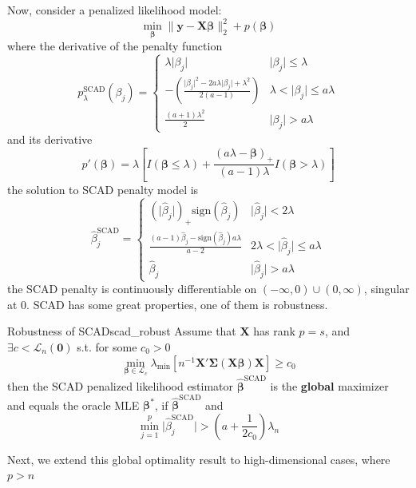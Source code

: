 \documentclass[twoside]{article}
\begin{document}
Now, consider a penalized likelihood model:  \citep[smoothly clipped
absolute deviation]{fan2001variable}
$$
\min_{\boldsymbol{\beta}} \lVert \mathbf{y}-\mathbf{X}\boldsymbol{\beta} \rVert^2_2 + p(\boldsymbol{\beta})
$$
where the derivative of the penalty function
$$
p_{\lambda}^{\text{SCAD}}(\beta_j) = \begin{cases}
    \lambda \lvert \beta_j  \rvert & \lvert \beta_j \rvert \leq \lambda \\
    -\left( \frac{\lvert \beta_j \rvert^2 - 2a\lambda \lvert \beta_j \rvert + \lambda^2}{2(a-1)} \right) & \lambda <\lvert \beta_j \rvert \leq a\lambda\\
    \frac{(a+1)\lambda^2}{2} & \lvert \beta_j \rvert > a\lambda
\end{cases}
$$
and its derivative
$$
p'(\boldsymbol{\beta}) = \lambda \left[ I(\boldsymbol{\beta} \leq \lambda) + \frac{(a\lambda - \boldsymbol{\beta})_+}{(a-1)\lambda} I(\boldsymbol{\beta}>\lambda) \right]
$$
the solution to SCAD penalty model is
$$
\hat{\beta}_j^{\text{SCAD}} = \begin{cases}
    (\lvert \hat{\beta}_j \rvert)_+\mathrm{sign}(\hat{\beta}_j) & \lvert \hat{\beta}_j \rvert< 2\lambda \\
    \frac{(a-1)\hat{\beta}_j-\mathrm{sign}(\hat{\beta}_j)a\lambda}{a-2} & 2\lambda < \lvert \hat{\beta}_j \rvert \leq a\lambda \\
    \hat{\beta}_j & \lvert \hat{\beta}_j \rvert> a\lambda
\end{cases}
$$
the SCAD penalty is continuously differentiable on $(-\infty,0)\cup (0,\infty)$, singular at $0$. SCAD has some great properties, one of them is robustness.
\begin{proposition}{Robustness of SCAD}{scad_robust}
    Assume that $\mathbf{X}$ has rank $p=s$, and $\exists c< \mathcal{L}_n(\mathbf{0})$ s.t. for some $c_0 > 0$
    $$
    \min_{\boldsymbol{\beta}\in \mathcal{L}_c} \lambda_{\min} \left[n^{-1} \mathbf{X}'\boldsymbol{\Sigma}(\mathbf{X}\boldsymbol{\beta})\mathbf{X} \right]\geq c_0
    $$
    then the SCAD penalized likelihood estimator $\hat{\boldsymbol{\beta}}^{\text{SCAD}}$ is the \textbf{global} maximizer and equals the oracle MLE $\boldsymbol{\beta}^*$, if $\hat{\boldsymbol{\beta}}^{\text{SCAD}}$ and 
    $$
    \min_{j=1}^p \lvert \hat{\beta}^{\text{SCAD}}_j \rvert > \left( a + \frac{1}{2c_0} \right) \lambda_n
    $$
\end{proposition}
Next, we extend this global optimality result to high-dimensional cases, where $p>n$
\end{document}
